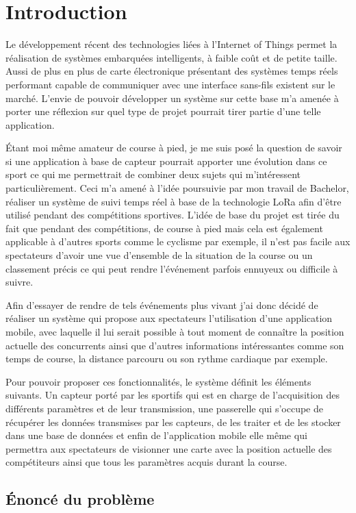 \chapter{Introduction}

Le développement récent des technologies liées à l'Internet of Things permet la réalisation de systèmes embarquées intelligents, à faible coût et de petite taille. Aussi de plus en plus de carte électronique présentant des systèmes temps réels performant capable de communiquer avec une interface sans-fils existent sur le marché. L'envie de pouvoir développer un système sur cette base m'a amenée à porter une réflexion sur quel type de projet pourrait tirer partie d'une telle application. 

Étant moi même amateur de course à pied, je me suis posé la question de savoir si une application à base de capteur pourrait apporter une évolution dans ce sport ce qui me permettrait de combiner deux sujets qui m'intéressent particulièrement. Ceci m'a amené à l'idée poursuivie par mon travail de Bachelor, réaliser un système de suivi temps réel à base de la technologie LoRa afin d'être utilisé pendant des compétitions sportives. L'idée de base du projet est tirée du fait que pendant des compétitions, de course à pied mais cela est également applicable à d'autres sports comme le cyclisme par exemple, il n'est pas facile aux spectateurs d'avoir une vue d'ensemble de la situation de la course ou un classement précis ce qui peut rendre l'événement parfois ennuyeux ou difficile à suivre.

Afin d'essayer de rendre de tels événements plus vivant j'ai donc décidé de réaliser un système qui propose aux spectateurs l'utilisation d'une application mobile, avec laquelle il lui serait possible à tout moment de connaître la position actuelle des concurrents ainsi que d'autres informations intéressantes comme son temps de course, la distance parcouru ou son rythme cardiaque par exemple. 

Pour pouvoir proposer ces fonctionnalités, le système définit les éléments suivants. Un capteur porté par les sportifs qui est en charge de l'acquisition des différents paramètres et de leur transmission, une passerelle qui s'occupe de récupérer les données transmises par les capteurs, de les traiter et de les stocker dans une base de données et enfin de l'application mobile elle même qui permettra aux spectateurs de visionner une carte avec la position actuelle des compétiteurs ainsi que tous les paramètres acquis durant la course.


\section{Énoncé du problème}

